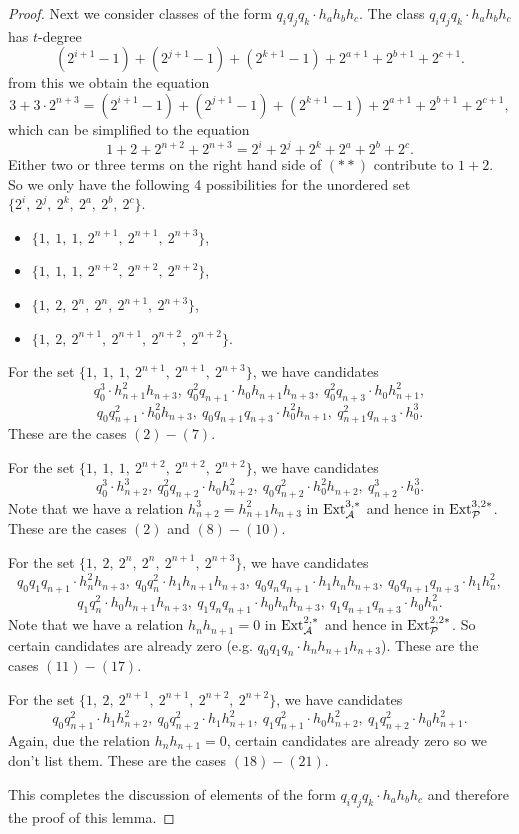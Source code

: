 \begin{proof}
Next we consider classes of the form $q_iq_jq_k \cdot h_ah_bh_c$.
The class $q_iq_jq_k \cdot h_ah_bh_c$ has $t$-degree
$$(2^{i+1} - 1) + (2^{j+1} - 1) + (2^{k+1} - 1) + 2^{a+1} + 2^{b+1} +2^{c+1}.$$
from this we obtain the equation
$$3 + 3 \cdot 2^{n+3} = (2^{i+1} - 1) + (2^{j+1} - 1) + (2^{k+1} - 1) + 2^{a+1} + 2^{b+1} +2^{c+1},$$
which can be simplified to the equation
\begin{equation}
1 + 2 + 2^{n+2} + 2^{n+3} = 2^i + 2^j + 2^k + 2^a + 2^b + 2^c. \tag{$**$}
\end{equation}
Either two or three terms on the right hand side of $(**)$ contribute to $1+2$. So we only have the following 4 possibilities for the unordered set $\{2^i, \ 2^j, \ 2^k, \ 2^a, \ 2^b, \ 2^c\}$.
\begin{itemize}
\item $\{1, \ 1, \ 1, \ 2^{n+1}, \ 2^{n+1}, \ 2^{n+3}\}$,
\item $\{1, \ 1, \ 1, \ 2^{n+2}, \ 2^{n+2}, \ 2^{n+2}\}$,
\item $\{1, \ 2, \ 2^n, \ 2^{n}, \ 2^{n+1}, \ 2^{n+3}\}$,
\item $\{1, \ 2, \ 2^{n+1}, \ 2^{n+1}, \ 2^{n+2}, \ 2^{n+2}\}$.
\end{itemize}
For the set $\{1, \ 1, \ 1, \ 2^{n+1}, \ 2^{n+1}, \ 2^{n+3}\}$, we have candidates 
$$q_0^3 \cdot h_{n+1}^2h_{n+3}, \ q_0^2q_{n+1} \cdot h_0h_{n+1}h_{n+3}, \ q_0^2q_{n+3} \cdot h_0h_{n+1}^2,$$
$$q_0q_{n+1}^2 \cdot h_0^2h_{n+3} , \ q_0q_{n+1}q_{n+3} \cdot h_0^2h_{n+1}, \ q_{n+1}^2q_{n+3} \cdot h_0^3.$$
These are the cases $(2)-(7)$.

For the set $\{1, \ 1, \ 1, \ 2^{n+2}, \ 2^{n+2}, \ 2^{n+2}\}$, we have candidates
$$q_0^3 \cdot h_{n+2}^3, \ q_0^2q_{n+2} \cdot h_0h_{n+2}^2, \ q_0q_{n+2}^2 \cdot h_0^2h_{n+2}, \ q_{n+2}^3 \cdot h_0^3.$$
Note that we have a relation $h_{n+2}^3 = h_{n+1}^2h_{n+3}$ in $\operatorname{\mathrm{Ext}}_{\operatorname{\mathcal{A}}}^{3,*}$ and hence in $\operatorname{\mathrm{Ext}}_{\mathcal{P}}^{3,2*}$. These are the cases $(2)$ and $(8)-(10)$.

For the set $\{1, \ 2, \ 2^n, \ 2^{n}, \ 2^{n+1}, \ 2^{n+3}\}$, we have candidates
$$q_0q_1q_{n+1} \cdot h_{n}^2h_{n+3}, \ q_0q_{n}^2 \cdot h_1h_{n+1}h_{n+3}, \ q_0q_nq_{n+1} \cdot h_1h_{n}h_{n+3}, \ q_0q_{n+1}q_{n+3} \cdot h_1h_{n}^2,$$
$$q_1q_{n}^2 \cdot h_0h_{n+1}h_{n+3}, \ q_1q_nq_{n+1} \cdot h_0h_{n}h_{n+3}, \ q_1q_{n+1}q_{n+3} \cdot h_0h_{n}^2.$$
Note that we have a relation $h_{n} h_{n+1}=0$ in $\operatorname{\mathrm{Ext}}_{\operatorname{\mathcal{A}}}^{2,*}$ and hence in $\operatorname{\mathrm{Ext}}_{\mathcal{P}}^{2,2*}$. So certain candidates are already zero (e.g. $q_0q_1q_{n} \cdot h_{n}h_{n+1}h_{n+3}$).  These are the cases $(11)-(17)$.

For the set $\{1, \ 2, \ 2^{n+1}, \ 2^{n+1}, \ 2^{n+2}, \ 2^{n+2}\}$, we have candidates
$$q_0q_{n+1}^2 \cdot h_1h_{n+2}^2, \ q_0q_{n+2}^2 \cdot h_1h_{n+1}^2, \ q_1q_{n+1}^2 \cdot h_0h_{n+2}^2, \ q_1q_{n+2}^2 \cdot h_0h_{n+1}^2.$$
Again, due the relation $h_{n} h_{n+1}=0$, certain candidates are already zero so we don't list them. These are the cases $(18)-(21)$.

This completes the discussion of elements of the form $q_iq_jq_k \cdot h_ah_bh_c$ and therefore the proof of this lemma.
\end{proof}

